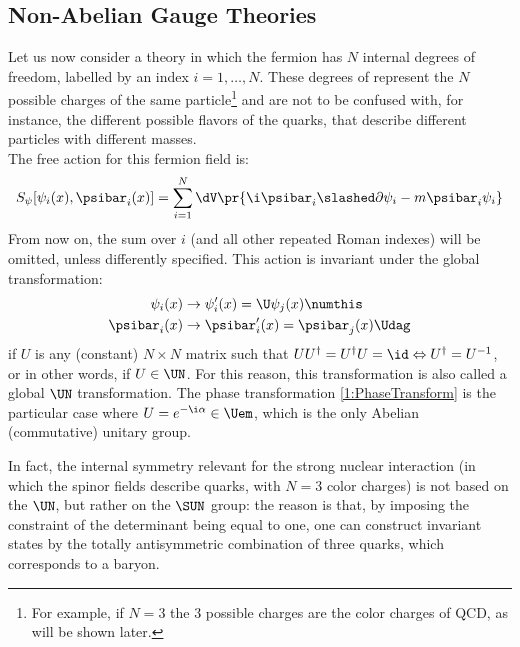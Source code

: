 \subsection{Non-Abelian Gauge Theories\label{Sec1:NonAbelianGaugeTheories}}
Let us now consider a theory in which the fermion has $N$ internal degrees of freedom, labelled by an index $i=1, \dots, N$.
These degrees of represent the $N$ possible charges of the same particle\footnote{For example, if $N=3$ the $3$ possible charges are the color charges of QCD, as will be shown later.} and are not to be confused with, for instance, the different possible flavors of the quarks, that describe different particles with different masses.\\
The free action for this fermion field is:
\begin{equation}
    S_\psi[\psi_i(x),\psibar_i(x)] = \sum_{i=1}^N\dV\pr{\i\psibar_i\slashed\partial\psi_i - m\psibar_i\psi_i} \label{1:FreeFermionAction}
\end{equation}
From now on, the sum over $i$ (and all other repeated Roman indexes) will be omitted, unless differently specified.
This action is invariant under the global transformation:
\begin{align*}
    \psi_i(x) &\rightarrow \psi_i'(x) = \U\psi_j(x) \numthis\label{1:UNTransform}\\
    \psibar_i(x) &\rightarrow \psibar_i'(x) = \psibar_j(x)\Udag
\end{align*}
if $U$ is any (constant) $N\times N$ matrix such that $UU^\dagger = U^\dagger U = \id \Leftrightarrow U^\dagger=U^{-1}$, or in other words, if $U\in\UN$.
For this reason, this transformation is also called a global $\UN$ transformation.
The phase transformation \eqref{1:PhaseTransform} is the particular case where $U=e^{-\i\alpha}\in\Uem$, which is the only Abelian (commutative) unitary group.

In fact, the internal symmetry relevant for the strong nuclear interaction (in which the spinor fields describe quarks, with $N=3$ color charges) is not based on the $\UN$, but rather on the $\SUN$ group: the reason is that, by imposing the constraint of the determinant being equal to one, one can construct invariant states by the totally antisymmetric combination of three quarks, which corresponds to a baryon.

